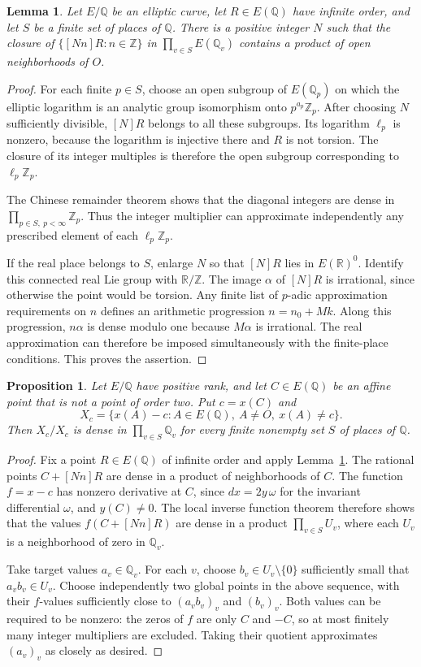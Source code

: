 \documentclass[11pt,a4paper]{article}
\newtheorem{proposition}[theorem]{Proposition}
\newtheorem{lemma}[theorem]{Lemma}
\theoremstyle{definition}
\newcommand{\Q}{\mathbb Q}\newcommand{\Z}{\mathbb Z}
\begin{document}
\begin{lemma}\label{lem:cyclic-density}
Let $E/\Q$ be an elliptic curve, let $R\in E(\Q)$ have infinite
order, and let $S$ be a finite set of places of $\Q$.
There is a positive integer $N$ such that the closure of
$\{[Nn]R:n\in\Z\}$ in $\prod_{v\in S}E(\Q_v)$ contains a product
of open neighborhoods of $O$.
\end{lemma}
\begin{proof}
For each finite $p\in S$, choose an open subgroup of $E(\Q_p)$
on which the elliptic logarithm is an analytic group isomorphism
onto $p^{a_p}\Z_p$. After choosing $N$ sufficiently divisible,
$[N]R$ belongs to all these subgroups. Its logarithm $\ell_p$ is
nonzero, because the logarithm is injective there and $R$ is
not torsion. The closure of its integer multiples is therefore
the open subgroup corresponding to $\ell_p\Z_p$.

The Chinese remainder theorem shows that the diagonal integers
are dense in $\prod_{p\in S,\ p<\infty}\Z_p$. Thus the integer
multiplier can approximate independently any prescribed element
of each $\ell_p\Z_p$.

If the real place belongs to $S$, enlarge $N$ so that $[N]R$ lies
in $E(\mathbb R)^0$. Identify this connected real Lie group with
$\mathbb R/\mathbb Z$. The image $\alpha$ of $[N]R$ is irrational,
since otherwise the point would be torsion. Any finite list of
$p$-adic approximation requirements on $n$ defines an arithmetic
progression $n=n_0+Mk$. Along this progression,
$n\alpha$ is dense modulo one because $M\alpha$ is irrational.
The real approximation can therefore be imposed simultaneously
with the finite-place conditions. This proves the assertion.
\end{proof}

\begin{proposition}\label{prop:general-density}
Let $E/\Q$ have positive rank, and let $C\in E(\Q)$ be an affine
point that is not a point of order two. Put $c=x(C)$ and
\[
 X_c=\{x(A)-c:A\in E(\Q),\ A\ne O,\ x(A)\ne c\}.
\]
Then $X_c/X_c$ is dense in $\prod_{v\in S}\Q_v$ for every finite
nonempty set $S$ of places of $\Q$.
\end{proposition}
\begin{proof}
Fix a point $R\in E(\Q)$ of infinite order and apply
Lemma~\ref{lem:cyclic-density}. The rational points
$C+[Nn]R$ are dense in a product of neighborhoods of $C$.
The function $f=x-c$ has nonzero derivative at $C$, since
$dx=2y\,\omega$ for the invariant differential $\omega$, and
$y(C)\ne0$. The local inverse function theorem therefore shows
that the values $f(C+[Nn]R)$ are dense in a product
$\prod_{v\in S}U_v$, where each $U_v$ is a neighborhood of zero
in $\Q_v$.

Take target values $a_v\in\Q_v$. For each $v$, choose
$b_v\in U_v\setminus\{0\}$ sufficiently small that $a_vb_v\in U_v$.
Choose independently two global points in the above sequence,
with their $f$-values sufficiently close to $(a_vb_v)_v$ and
$(b_v)_v$. Both values can be required to be nonzero: the zeros
of $f$ are only $C$ and $-C$, so at most finitely many integer
multipliers are excluded. Taking their quotient approximates
$(a_v)_v$ as closely as desired.
\end{proof}
\end{document}
